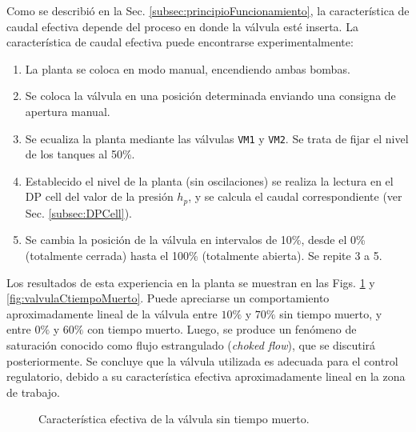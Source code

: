 Como se describió en la Sec. \ref{subsec:principioFuncionamiento}, la
característica de caudal efectiva depende del proceso en donde la válvula esté
inserta. La característica de caudal efectiva puede encontrarse
experimentalmente:
\begin{enumerate}
 \item La planta se coloca en modo manual, encendiendo ambas bombas.
 \item Se coloca la válvula en una posición determinada enviando una consigna
de apertura manual.
 \item Se ecualiza la planta mediante las válvulas \verb|VM1| y \verb|VM2|. Se
trata de fijar el nivel de los tanques al 50\%.
 \item Establecido el nivel de la planta (sin oscilaciones) se realiza la
lectura en el DP cell del valor de la presión $h_p$,
y se calcula el caudal correspondiente (ver Sec. \ref{subsec:DPCell}).
 \item Se cambia la posición de la válvula en intervalos de
 10\%, desde el 0\% (totalmente cerrada) hasta el 100\% (totalmente abierta).
Se repite 3 a 5.
\end{enumerate}

Los resultados de esta experiencia en la planta se muestran en las Figs.
\ref{fig:valvulaStiempoMuerto} y \ref{fig:valvulaCtiempoMuerto}.
Puede apreciarse un comportamiento aproximadamente lineal de la válvula entre
$10\%$ y $70\%$ sin tiempo muerto, y entre $0\%$ y $60\%$ con tiempo muerto.
Luego, se produce un fenómeno de saturación conocido como flujo
estrangulado (\emph{choked flow}), que se discutirá posteriormente.
Se concluye que la válvula utilizada es adecuada para el
control regulatorio, debido a su característica efectiva aproximadamente lineal
en la zona de trabajo.

\begin{figure}[ht]
  \centering
\caption{Característica efectiva de la válvula sin tiempo muerto.}
\label{fig:valvulaStiempoMuerto}
\end{figure}

